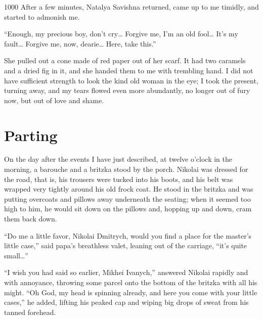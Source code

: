 \begin{tolerant}{1000}
After a few minutes, Natalya Savishna returned, came up to me timidly, and started to admonish me.
\end{tolerant}

``Enough, my precious boy, don't cry\ldots{} Forgive me, I'm an old fool\ldots{} It's my fault\ldots{} Forgive me, now, dearie\ldots{} Here, take this.'' %

She pulled out a cone made of red paper out of her scarf. It had two caramels and a dried fig in it, and she handed them to me with trembling hand. I did not have sufficient strength to look the kind old woman in the eye; I took the present, turning away, and my tears flowed even more abundantly, no longer out of fury now, but out of love and shame.

\chapter{Parting} %

On the day after the events I have just described, at twelve o'clock in the morning, a barouche and a britzka stood by the porch. Nikolai was dressed for the road, that is, his trousers were tucked into his boots, and his belt was wrapped very tightly around his old frock coat. He stood in the britzka and was putting overcoats and pillows away underneath the seating; when it seemed too high to him, he would sit down on the pillows and, hopping up and down, cram them back down.

``Do me a little favor, Nikolai Dmitrych, would you find a place for the master's little case,'' said papa's breathless valet, leaning out of the carriage, ``it's quite small\ldots{}'' %

``I wish you had said so earlier, Mikhei Ivanych,'' answered Nikolai rapidly and with annoyance, throwing some parcel onto the bottom of the britzka with all his might. ``Oh God, my head is spinning already, and here you come with your little cases,'' he added, lifting his peaked cap and wiping big drops of sweat from his tanned forehead. %

